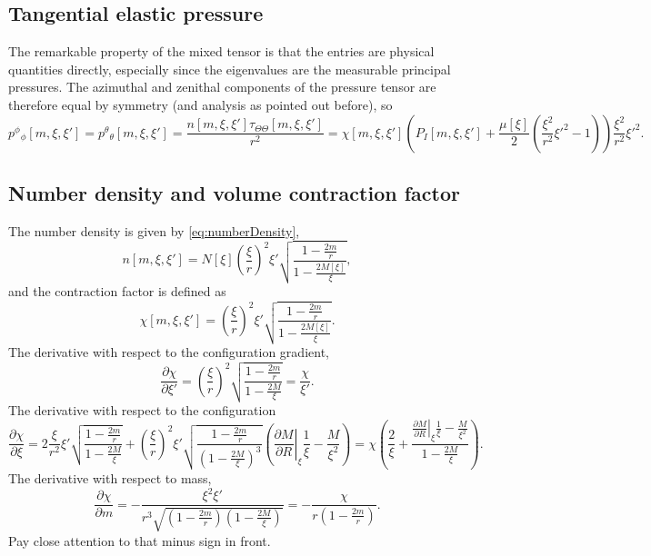 \subsection{Tangential elastic pressure}
The remarkable property of the mixed tensor is that the entries are physical quantities directly, especially since the eigenvalues are the measurable principal pressures. The azimuthal and zenithal components of the pressure tensor are therefore equal by symmetry (and analysis as pointed out before), so
\begin{equation}
p^\phi{}_\phi[m,\xi,\xi'] = p^\theta{}_\theta[m,\xi,\xi'] = \frac{n[m,\xi,\xi']\tau_{\Theta\Theta}[m,\xi,\xi']}{r^2} = \chi[m,\xi,\xi']\left(P_I[m,\xi,\xi'] + \frac{\mu[\xi]}{2} \left(\frac{\xi^2}{r^2}\xi'^2 - 1\right) \right) \frac{\xi^2}{r^2}\xi'^2.
\label{eq:tangentialPressureExpanded}
\end{equation}

\subsection{Number density and volume contraction factor}
The number density is given by \eqref{eq:numberDensity},
\begin{equation}
n[m,\xi,\xi'] = N[\xi]\left(\frac{\xi}{r}\right)^2\xi'\sqrt{\frac{1-\frac{2m}{r}}{1-\frac{2M[\xi]}{\xi}}},
\label{eq:numberDensityExpanded}
\end{equation}
and the contraction factor is defined as
\begin{equation}
\chi[m,\xi,\xi'] = \left(\frac{\xi}{r}\right)^2\xi'\sqrt{\frac{1-\frac{2m}{r}}{1-\frac{2M[\xi]}{\xi}}}.
\label{eq:contractionFactorExpanded}
\end{equation}
The derivative with respect to the configuration gradient,
\begin{equation}
\frac{\partial \chi}{\partial \xi'} = \left(\frac{\xi}{r}\right)^2\sqrt{\frac{1-\frac{2m}{r}}{1-\frac{2M}{\xi}}} = \frac{\chi}{\xi'}.
\label{eq:dcontractionFactor:dxi}
\end{equation}
The derivative with respect to the configuration
\begin{equation}
\frac{\partial \chi}{\partial \xi} =  2\frac{\xi}{r^2}\xi'\sqrt{\frac{1-\frac{2m}{r}}{1-\frac{2M}{\xi}}} + \left(\frac{\xi}{r}\right)^2\xi'\sqrt{\frac{1-\frac{2m}{r}}{\left(1-\frac{2M}{\xi}\right)^3}} \left(\left.\frac{\partial M}{\partial R}\right|_\xi\frac{1}{\xi} - \frac{M}{\xi^2}\right) = \chi\left(\frac{2}{\xi} + \frac{\left.\frac{\partial M}{\partial R}\right|_\xi\frac{1}{\xi} - \frac{M}{\xi^2}}{1 - \frac{2M}{\xi}}\right).
\label{eq:dcontractionFactor:xi}
\end{equation}
The derivative with respect to mass,
\begin{equation}
\frac{\partial \chi}{\partial m} = -\frac{\xi^2\xi'}{r^3\sqrt{\left(1-\frac{2m}{r}\right) \left(1-\frac{2M}{\xi}\right)}} = -\frac{\chi}{r\left(1 - \frac{2m}{r}\right)}.
\label{eq:dcontractionFactor:m}
\end{equation}
Pay close attention to that minus sign in front.

